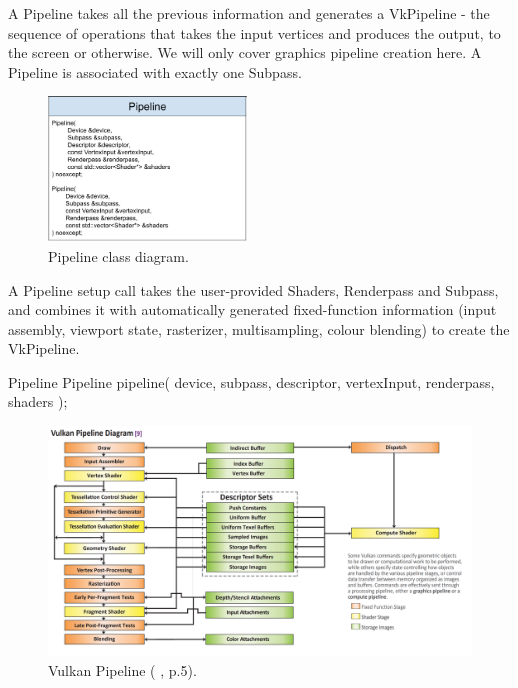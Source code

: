 \documentclass[12pt]{report}
\newcommand{\citediagram}[2]{(\citeauthor{#1} \citeyear{#1}, p.#2)}
\newcommand{\imagewidth}{0.47\textwidth}
\theoremstyle{definition}
\begin{document}
        A Pipeline takes all the previous information and generates a
        VkPipeline - the sequence of operations that takes the input vertices
        and produces the output, to the screen or otherwise. We will only
        cover graphics pipeline creation here. A Pipeline is associated with
        exactly one Subpass.
        
        \begin{figure}[h]
          \centering
          \includegraphics[width=\imagewidth]{images/class_pipeline.png}
          \caption{Pipeline class diagram.}
          \label{fig:class_pipeline}
        \end{figure}

        A Pipeline setup call takes the user-provided Shaders, Renderpass and
        Subpass, and combines it with automatically generated
        fixed-function information (input assembly, viewport state,
        rasterizer, multisampling, colour blending) to create the VkPipeline.

        \begin{usage}{Pipeline}
  Pipeline pipeline(
    device, subpass, descriptor, vertexInput,
    renderpass, shaders
  );
        \end{usage}

        \begin{figure}[h]
          \centering
          \includegraphics[width=\textwidth]{images/vulkan_pipeline.png}
          \caption{Vulkan Pipeline \citediagram{reference_guide}{5}.}
          \label{fig:vulkan_pipeline}
        \end{figure}
\end{document}
